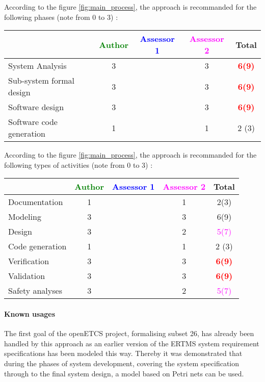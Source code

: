 According to the figure \ref{fig:main_process}, the approach is recommanded for the following phases (note from 0 to  3) :

\begin{tabular}{|l | c | c | c | c|}
\hline
& \textcolor{green}{Author} & \textcolor{blue}{Assessor 1} & \textcolor{magenta}{Assessor 2} & Total \\
\hline 
System Analysis & 3     & & 3     & \textcolor{red}{\textbf{6(9)}}  \\
\hline
Sub-system formal design & 3     & & 3     & \textcolor{red}{\textbf{6(9)}}  \\
\hline
Software design & 3     & & 3     & \textcolor{red}{\textbf{6(9)}}  \\
\hline
Software code generation & 1     & & 1     & 2 (3) \\
\hline
\end{tabular}

According to the figure \ref{fig:main_process}, the approach is recommanded for the following types of activities (note from 0 to  3) :

\begin{tabular}{|l | c | c | c | c|}
\hline
& \textcolor{green}{Author} & \textcolor{blue}{Assessor 1} & \textcolor{magenta}{Assessor 2} & Total \\
\hline 
Documentation & 1     & & 1     &  2(3) \\
\hline
Modeling & 3     & & 3     &  6(9) \\
\hline
Design & 3     & & 2     & \textcolor{magenta}{5(7)}  \\
\hline
Code generation & 1     & & 1     & 2 (3) \\
\hline
Verification & 3     & & 3     & \textcolor{red}{\textbf{6(9)}}  \\
\hline
Validation & 3     & & 3     & \textcolor{red}{\textbf{6(9)}}  \\
\hline
Safety analyses & 3     & & 2     & \textcolor{magenta}{5(7)}  \\
\hline
\end{tabular}

\paragraph{Known usages} 

The first goal of the openETCS project, formalising subset 26, has already been handled by this approach as  an earlier version of the ERTMS system requirement specifications has been modeled this way. Thereby it  was  demonstrated  that  during  the  phases  of  system development, covering the system specification through to the final system design, a  model based on Petri nets can be used.


